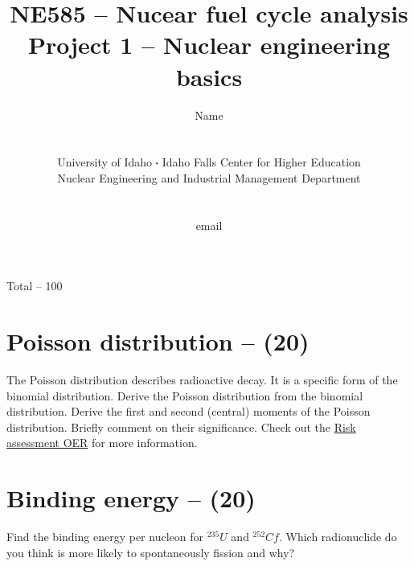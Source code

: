 \documentclass[11pt,a4paper]{article}
\newcommand*\sq{\mathbin{\vcenter{\hbox{\rule{.3ex}{.3ex}}}}} %
\begin{document}
\begin{titlepage}
    \title{
        NE585 -- Nucear fuel cycle analysis\\
        Project 1 -- Nuclear engineering basics\\
    }
    \author{
        Name
        \\ \\ \\
        University of Idaho $\sq$ Idaho Falls Center for Higher Education\\
        Nuclear Engineering and Industrial Management Department
        \\ \\ \\
        email 
    }
\clearpage %
\maketitle
\vspace*{\fill}
\begin{flushright}{
        Total -- 100
}
\end{flushright}
\thispagestyle{empty} %
\end{titlepage}


\section{Poisson distribution -- (20)} 
The Poisson distribution describes radioactive decay. It is a specific form of the binomial distribution. Derive the Poisson distribution from the binomial distribution. Derive the first and second (central) moments of the Poisson distribution. Briefly comment on their significance. Check out the \href{https://uidaho.pressbooks.pub/riskassessment/chapter/common-statistical-distributions/}{Risk assessment OER} for more information.





\newpage


\section{Binding energy -- (20)}
Find the binding energy per nucleon for $^{235}U$ and $^{252}Cf$. Which radionuclide do you think is more likely to spontaneously fission and why?
\end{document}
